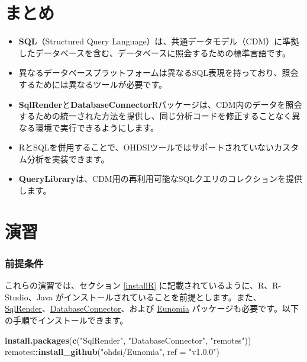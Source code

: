 \documentclass[
  11pt]{book}
\makeatletter
\newenvironment{Shaded}{\begin{snugshade}}{\end{snugshade}}
\newcommand{\AttributeTok}[1]{\textcolor[rgb]{0.13,0.29,0.53}{#1}}
\newcommand{\FunctionTok}[1]{\textcolor[rgb]{0.13,0.29,0.53}{\textbf{#1}}}
\newcommand{\NormalTok}[1]{#1}
\newcommand{\SpecialCharTok}[1]{\textcolor[rgb]{0.81,0.36,0.00}{\textbf{#1}}}
\newcommand{\StringTok}[1]{\textcolor[rgb]{0.31,0.60,0.02}{#1}}
\newenvironment{kframe}{%
\medskip{}
\setlength{\fboxsep}{.8em}
 \def\at@end@of@kframe{}%
 \ifinner\ifhmode%
  \def\at@end@of@kframe{\end{minipage}}%
  \begin{minipage}{\columnwidth}%
 \fi\fi%
 \def\FrameCommand##1{\hskip\@totalleftmargin \hskip-\fboxsep
 \colorbox{myShadeColor}{##1}\hskip-\fboxsep
     \hskip-\linewidth \hskip-\@totalleftmargin \hskip\columnwidth}%
 \MakeFramed {\advance\hsize-\width
   \@totalleftmargin\z@ \linewidth\hsize
   \@setminipage}}%
 {\par\unskip\endMakeFramed%
 \at@end@of@kframe}
\newenvironment{rmdblock}[1]
  {
  \begin{itemize}
  \renewcommand{\labelitemi}{
    \raisebox{-.7\height}[0pt][0pt]{
      {\setkeys{Gin}{width=3em,keepaspectratio}\texttt{[image: images/\#1]}}
    }
  }
  \setlength{\fboxsep}{1em}
  \begin{kframe}
  \item
  }
  {
  \end{kframe}
  \end{itemize}
  }
\newenvironment{rmdsummary}
  {\begin{rmdblock}{summary}}
  {\end{rmdblock}}
\theoremstyle{definition}
\theoremstyle{definition}
\theoremstyle{definition}
\theoremstyle{definition}
\theoremstyle{remark}
\makeatother
\begin{document}
\section{まとめ}\label{ux307eux3068ux3081-7}

\begin{rmdsummary}
\begin{itemize}
\item
  \textbf{SQL}（Structured Query Language）は、共通データモデル（CDM）に準拠したデータベースを含む、データベースに照会するための標準言語です。
\item
  異なるデータベースプラットフォームは異なるSQL表現を持っており、照会するためには異なるツールが必要です。
\item
  \textbf{SqlRender}と\textbf{DatabaseConnector}Rパッケージは、CDM内のデータを照会するための統一された方法を提供し、同じ分析コードを修正することなく異なる環境で実行できるようにします。
\item
  RとSQLを併用することで、OHDSIツールではサポートされていないカスタム分析を実装できます。
\item
  \textbf{QueryLibrary}は、CDM用の再利用可能なSQLクエリのコレクションを提供します。
\end{itemize}
\end{rmdsummary}

\section{演習}\label{ux6f14ux7fd2-4}

\subsubsection*{前提条件}\label{ux524dux63d0ux6761ux4ef6-3}

これらの演習では、セクション \ref{installR} に記載されているように、R、R-Studio、Java がインストールされていることを前提とします。また、\href{https://ohdsi.github.io/SqlRender/}{SqlRender}、\href{https://ohdsi.github.io/DatabaseConnector/}{DatabaseConnector}、および \href{https://ohdsi.github.io/Eunomia/}{Eunomia} パッケージも必要です。以下の手順でインストールできます。

\begin{Shaded}
\begin{Highlighting}[]
\FunctionTok{install.packages}\NormalTok{(}\FunctionTok{c}\NormalTok{(}\StringTok{"SqlRender"}\NormalTok{, }\StringTok{"DatabaseConnector"}\NormalTok{, }\StringTok{"remotes"}\NormalTok{))}
\NormalTok{remotes}\SpecialCharTok{::}\FunctionTok{install\_github}\NormalTok{(}\StringTok{"ohdsi/Eunomia"}\NormalTok{, }\AttributeTok{ref =} \StringTok{"v1.0.0"}\NormalTok{)}
\end{Highlighting}
\end{Shaded}
\end{document}
